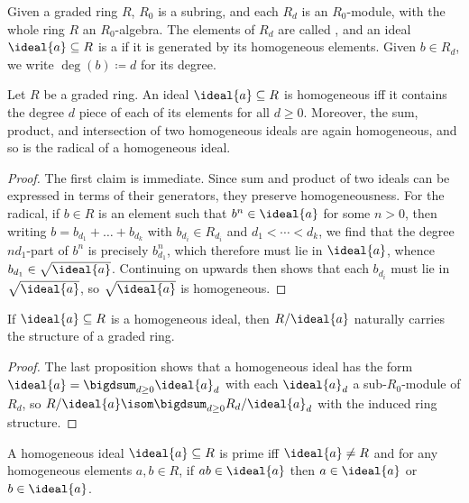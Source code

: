 \documentclass[wip, algebra]{bsteffan-lecturenotes}
\begin{document}
Given a graded ring $R$, $R_0$ is a subring, and each $R_d$ is an $R_0$-module, with the whole ring $R$ an $R_0$-algebra.
The elements of $R_d$ are called , and an ideal $\ideal{a} \subseteq R$ is a  if it is generated by its homogeneous elements.
Given $b \in R_d$, we write $\deg(b) \coloneq d$ for its degree.
\begin{proposition}
	Let $R$ be a graded ring.
	An ideal $\ideal{a} \subseteq R$ is homogeneous iff it contains the degree $d$ piece of each of its elements for all $d \geq 0$.
	Moreover, the sum, product, and intersection of two homogeneous ideals are again homogeneous, and so is the radical of a homogeneous ideal.
\end{proposition}
\begin{proof}
	The first claim is immediate.
	Since sum and product of two ideals can be expressed in terms of their generators, they preserve homogeneousness.
	For the radical, if $b \in R$ is an element such that $b^n \in \ideal{a}$ for some $n > 0$, then writing $b = b_{d_1} + \ldots + b_{d_k}$ with $b_{d_i} \in R_{d_i}$ and $d_1 < \cdots < d_k$, we find that the degree $nd_1$-part of $b^n$ is precisely $b_{d_1}^n$, which therefore must lie in $\ideal{a}$, whence $b_{d_1} \in \sqrt{\ideal{a}}$.
	Continuing on upwards then shows that each $b_{d_i}$ must lie in $\sqrt{\ideal{a}}$, so $\sqrt{\ideal{a}}$ is homogeneous.
\end{proof}
\begin{corollary}
	If $\ideal{a} \subseteq R$ is a homogeneous ideal, then $R / \ideal{a}$ naturally carries the structure of a graded ring.
\end{corollary}
\begin{proof}
	The last proposition shows that a homogeneous ideal has the form $\ideal{a} = \bigdsum_{d \geq 0} \ideal{a}_d$ with each $\ideal{a}_d$ a sub-$R_0$-module of $R_d$, so $R / \ideal{a} \isom \bigdsum_{d \geq 0} R_d / \ideal{a}_d$ with the induced ring structure.
\end{proof}
\begin{proposition}
	A homogeneous ideal $\ideal{a} \subseteq R$ is prime iff $\ideal{a} \neq R$ and for any homogeneous elements $a, b \in R$, if $ab \in \ideal{a}$ then $a \in \ideal{a}$ or $b \in \ideal{a}$.
\end{proposition}
\end{document}

